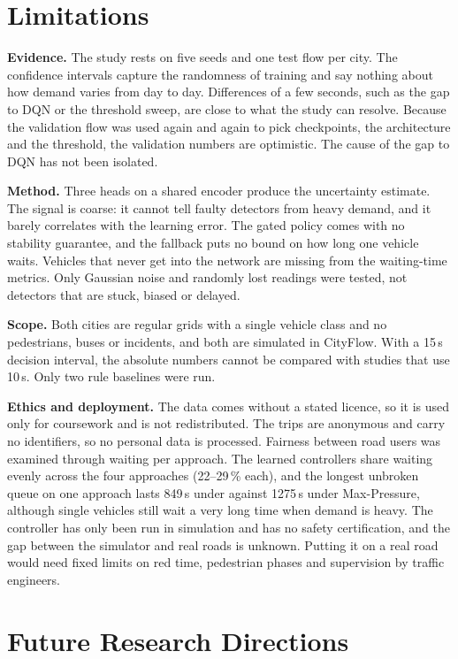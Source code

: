 \section{Limitations}

\textbf{Evidence.} The study rests on five seeds and one test flow per city. The confidence
intervals capture the randomness of training and say nothing about how demand varies from day
to day. Differences of a few seconds, such as the gap to DQN or the threshold sweep, are close
to what the study can resolve. Because the validation flow was used again and again to pick
checkpoints, the architecture and the threshold, the validation numbers are optimistic. The
cause of the gap to DQN has not been isolated.

\textbf{Method.} Three heads on a shared encoder produce the uncertainty estimate. The signal is
coarse: it cannot tell faulty detectors from heavy demand, and it barely correlates with the
learning error. The gated policy comes with no stability guarantee, and the fallback puts no
bound on how long one vehicle waits. Vehicles that never get into the network are missing from
the waiting-time metrics. Only Gaussian noise and randomly lost readings were tested, not
detectors that are stuck, biased or delayed.

\textbf{Scope.} Both cities are regular grids with a single vehicle class and no pedestrians,
buses or incidents, and both are simulated in CityFlow. With a 15\,s decision interval, the
absolute numbers cannot be compared with studies that use 10\,s. Only two rule baselines
were run.

\textbf{Ethics and deployment.} The data comes without a stated licence, so it is used only for
coursework and is not redistributed. The trips are anonymous and carry no identifiers, so no
personal data is processed. Fairness between road users was examined through waiting per
approach. The learned controllers share waiting evenly across the four approaches (22--29\,\%
each), and the longest unbroken queue on one approach lasts 849\,s under \ugmarl{} against
1275\,s under Max-Pressure, although single vehicles still wait a very long time when demand
is heavy. The controller has only been run in simulation and has no safety certification, and the
gap between the simulator and real roads is unknown. Putting it on a real road would need fixed
limits on red time, pedestrian phases and supervision by traffic engineers.

\section{Future Research Directions}

